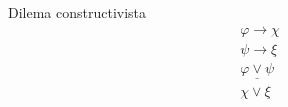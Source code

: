 \begin{ruleinf} \label{relinf_consdilemma} Dilema constructivista
	\begin{equation}
	\begin{gathered}
		\varphi \rightarrow \chi  \\
		\psi \rightarrow \xi  \\
		\underline {\varphi \lor \psi } \\
		\chi \lor \xi 
	\end{gathered}
	\end{equation}
\end{ruleinf}
